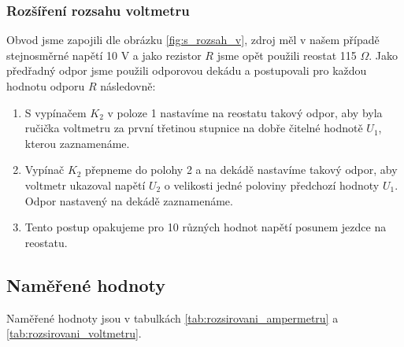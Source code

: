 \documentclass[english]{article}
\begin{document}
\subsubsection{Rozšíření rozsahu voltmetru}
Obvod jsme zapojili dle obrázku \ref{fig:s_rozsah_v}, zdroj měl v našem případě stejnosměrné napětí 10 V a jako rezistor $R$ jsme opět použili reostat 115 $\Omega$. Jako předřadný odpor jsme použili odporovou dekádu a postupovali pro každou hodnotu odporu $R$ následovně:
\begin{enumerate}
	\item S vypínačem $K_{2}$ v poloze 1 nastavíme na reostatu takový odpor, aby byla ručička voltmetru za první třetinou stupnice na dobře čitelné hodnotě $U_{1}$, kterou zaznamenáme.
	\item Vypínač $K_{2}$ přepneme do polohy 2 a na dekádě nastavíme takový odpor, aby voltmetr ukazoval napětí $U_{2}$ o velikosti jedné poloviny předchozí hodnoty $U_{1}$. Odpor nastavený na dekádě zaznamenáme.
	\item Tento postup opakujeme pro 10 různých hodnot napětí posunem jezdce na reostatu. 	
\end{enumerate}

\subsection{Naměřené hodnoty}
Naměřené hodnoty jsou v tabulkách \ref{tab:rozsirovani_ampermetru} a \ref{tab:rozsirovani_voltmetru}.
\end{document}
